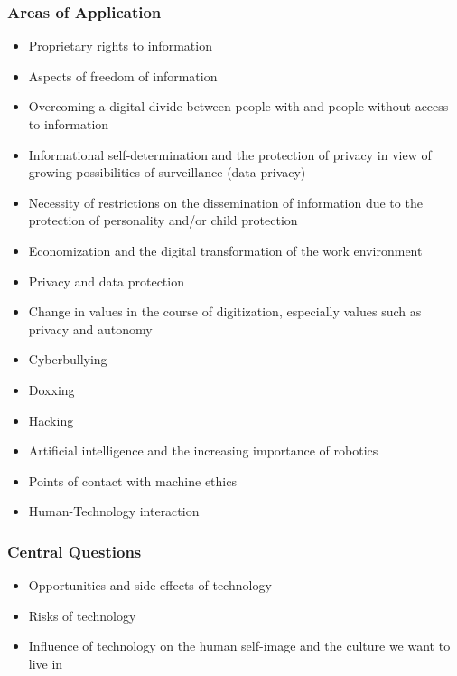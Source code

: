\documentclass[11pt]{article}
\theoremstyle{definition}
\begin{document}
\subsubsection{Areas of Application}
\begin{itemize}
	\item Proprietary rights to information
	\item Aspects of freedom of information
	\item Overcoming a digital divide between people with and people without access to information
	\item Informational self-determination and the protection of privacy in view of growing possibilities of surveillance (data privacy)
	\item Necessity of restrictions on the dissemination of information due to the protection of personality and/or child protection
	\item Economization and the digital transformation of the work environment
	\item Privacy and data protection
	\item Change in values in the course of digitization, especially values such as privacy and autonomy
	\item Cyberbullying
	\item Doxxing
	\item Hacking
	\item Artificial intelligence and the increasing importance of robotics
	\item Points of contact with machine ethics
	\item Human-Technology interaction
\end{itemize}

\subsubsection{Central Questions}
\begin{itemize}
	\item Opportunities and side effects of technology
	\item Risks of technology
	\item Influence of technology on the human self-image and the culture we want to live in
\end{itemize}
\end{document}
